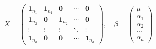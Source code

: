 \begin{definition}
\begin{gather*}
		X=
		\begin{pmatrix}
			\mathbf{1}_{n_1} & \mathbf{1}_{n_1} & \mathbf{0} & \cdots & \mathbf{0} \\
			\mathbf{1}_{n_2} & \mathbf{0} & \mathbf{1}_{n_2} & \cdots & \mathbf{0} \\
			\vdots & \vdots & \vdots & \ddots & \vdots \\
			\mathbf{1}_{n_a} & \mathbf{0} & \mathbf{0} & \cdots & \mathbf{1}_{n_a}
		\end{pmatrix},\quad
		\beta=
		\begin{pmatrix}
			\mu \\
			\alpha_1 \\
			\alpha_2 \\
			\cdots \\
			\alpha_a
		\end{pmatrix}
	\end{gather*}
\end{definition}
